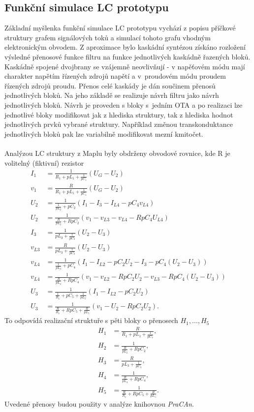 \subsection{Funkční simulace LC prototypu}\label{s:KASK}
Základní myšlenka funkční simulace LC prototypu vychází z popisu příčkové struktury grafem signálových toků a simulací tohoto grafu vhodným elektronickým obvodem. Z aproximace bylo kaskádní syntézou získáno rozložení výsledné přenosové funkce filtru na funkce jednotlivých kaskádně řazených bloků. Kaskádně spojené dvojbrany se vzájemně neovlivňují - v napěťovém módu mají charakter napětím řízených zdrojů napětí a v~proudovém módu proudem řízených zdrojů proudu. Přenos celé kaskády je dán součinem přenosů jednotlivých bloků. Na jeho základě se realizuje návrh filtru jako návrh jednotlivých bloků. Návrh je proveden s bloky s~jedním OTA a po realizaci lze jednotlivé bloky modifikovat jak z hlediska struktury, tak z hlediska hodnot jednotlivých prvků vybrané struktury. Například změnou transkonduktance jednotlivých bloků pak lze variabilně modifikovat mezní kmitočet.\\
\\
\noindent Analýzou LC struktury z Maplu byly obdrženy obvodové rovnice, kde R je volitelný (fiktivní) rezistor
\begin{align}
I_1 &= \frac{1}{R_1 + pL_1 + \frac{1}{pC_1}}(U_G - U_2)\\
v_1 & = \frac{R}{R_1 + pL_1 + \frac{1}{pC_1}}(U_G - U_2)\\
U_2 &= \frac{1}{\frac{1}{pL_2} + pC_2}(I_1 - I_{3} - I_{L4} - pC_4 v_{L4})\\
U_2 &= \frac{1}{\frac{R}{pL_2} + RpC_2}(v_1 - v_{L3} - v_{L4} - RpC_4 U_{L4})\\
I_{3} &= \frac{1}{pL_3 + \frac{1}{pC_3}}(U_2 - U_3)\\
v_{L3} &= \frac{R}{pL_3 + \frac{1}{pC_3}}(U_2 - U_3)\\
v_{L4} &= \frac{1}{\frac{1}{pL_4}+pC_4}(I_1 - I_{L2} - pC_2U_2 - I_{3} - pC_4 (U_2 - U_3))\\
v_{L4} &= \frac{1}{\frac{R}{pL_4}+RpC_4}(v_1 - v_{L2} - RpC_2U_2 - v_{L3} - RpC_4 (U_2 - U_3))\\
U_3 &= \frac{1}{\frac{1}{R_z}+pC_5 + \frac{1}{pL_5}}(I_1 - I_{L2} - pC_2U_2)\\
U_3 &= \frac{1}{\frac{R}{R_z}+RpC_5 + \frac{R}{pL_5}}(v_1 - U_2 - RpC_2 U_2).
\end{align}
\noindent To odpovídá realizační struktuře s pěti bloky o přenosech $H_1, \ldots,H_5$
\begin{align}
H_1 & = \frac{R}{R_1 + pL_1 + \frac{1}{pC_1}},\\
H_2 &= \frac{1}{\frac{R}{pL_2} + RpC_2},\\
H_3 &= \frac{R}{pL_3 + \frac{1}{pC_3}},\\
H_4 &= \frac{1}{\frac{R}{pL_4}+RpC_4},\\
H_5 &= \frac{1}{\frac{R}{R_z}+RpC_5 + \frac{R}{pL_5}}.
\end{align}
\noindent Uvedené přenosy budou použity v analýze knihovnou \textit{PraCAn}.
